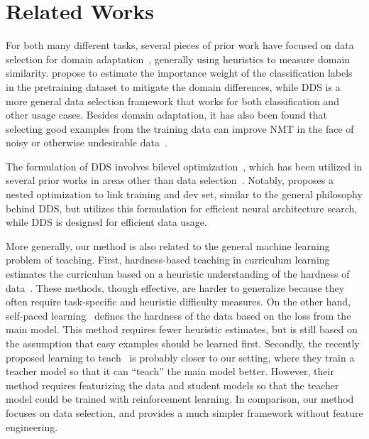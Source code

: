 \section{\label{sec:related_work}Related Works}

For both many different tasks, several pieces of prior work have focused on data selection for domain adaptation~\citep{moore2010intelligent,axelrod2011domain,domain_adapt_transfer,jiang-zhai-2007-instance,foster-etal-2010-discriminative,wang-etal-2017-instance}, generally using heuristics to measure domain similarity.
\cite{domain_adapt_transfer} propose to estimate the importance weight of the classification labels in the pretraining dataset to mitigate the domain differences, while DDS is a more general data selection framework that works for both classification and other usage cases.
Besides domain adaptation, it has also been found that selecting good examples from the training data can improve NMT in the face of noisy or otherwise undesirable data~\citep{vyas-etal-2018-identifying,pham-etal-2018-fixing}.  

The formulation of DDS involves bilevel optimization~\citep{bilevel_optim,hier_optim}, which has been utilized in several prior works in areas other than data selection~\citep{darts,hyper_grad,finn2017model}.
Notably, \cite{darts} proposes a nested optimization to link training and dev set, similar to the general philosophy behind DDS, but utilizes this formulation for efficient neural architecture search, while DDS is designed for efficient data usage.

More generally, our method is also related to the general machine learning problem of teaching. First, hardness-based teaching in curriculum learning estimates the curriculum based on a heuristic understanding of the hardness of data~\citep{cl_bengio,automate_cl_GravesBMMK17,SpitkovskyAJ10,zhang2016boosting,zhang2018empirical,platanios19naacl,baysian_curriculum}. These methods, though effective, are harder to generalize because they often require task-specific and heuristic difficulty measures. On the other hand, self-paced learning~\citep{spl_visual_category,spl_kumar,spl_visual_category} defines the hardness of the data based on the loss from the main model. This method requires fewer heuristic estimates, but is still based on the assumption that easy examples should be learned first. Secondly, the recently proposed learning to teach~\citep{learn_to_teach} is probably closer to our setting, where they train a teacher model so that it can ``teach'' the main model better. However, their method requires featurizing the data and student models so that the teacher model could be trained with reinforcement learning. In comparison, our method focuses on data selection, and provides a much simpler framework without feature engineering. 

